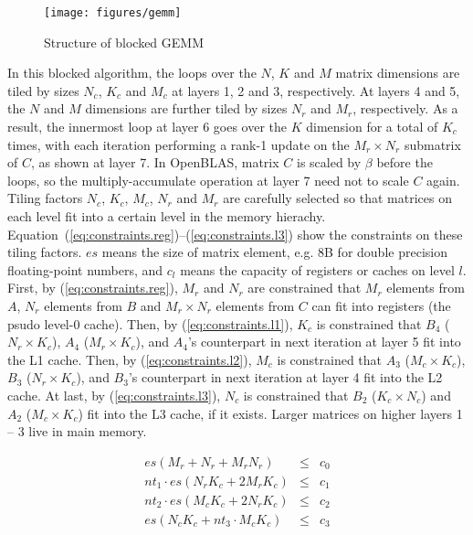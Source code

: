 \begin{figure}[t]
  \centering
  \texttt{[image: figures/gemm]}
  \caption{Structure of blocked GEMM}
  \label{fig:gemm}
\end{figure}

In this blocked algorithm, the loops over the $N$, $K$ and $M$
matrix dimensions are tiled by sizes $N_c$, $K_c$ and $M_c$ at 
layers 1, 2 and 3, respectively.
At layers 4 and 5, the $N$ and $M$ dimensions are further tiled by sizes
$N_r$ and $M_r$, respectively.
As a result, the innermost loop at layer 6 goes over the $K$
dimension for a total of $K_c$ times,
with each iteration performing a rank-1 update on
the $M_r \times N_r$ submatrix of $C$, as shown at layer 7.
In OpenBLAS, matrix $C$ is scaled by $\beta$ before the loops,
so the multiply-accumulate operation at layer 7 need not to scale $C$ again.
Tiling factors $N_c$, $K_c$, $M_c$, $N_r$ and $M_r$ are carefully selected so that
matrices on each level fit into a certain level in the memory hierachy.
Equation~(\ref{eq:constraints.reg})--(\ref{eq:constraints.l3}) show
the constraints on these tiling factors.
$es$ means the size of matrix element, e.g. 8B for double precision floating-point numbers,
and $c_l$ means the capacity of registers or caches on level $l$.
First, by (\ref{eq:constraints.reg}), $M_r$ and $N_r$ are constrained that $M_r$ elements from $A$,
$N_r$ elements from $B$ and $M_r \times N_r$ elements from $C$ can fit into registers
(the psudo level-0 cache).
Then, by (\ref{eq:constraints.l1}), $K_c$ is constrained that $B_4$ ($N_r \times K_c$),
$A_4$ ($M_r \times K_c$), and $A_4$'s counterpart in next iteration
at layer 5 fit into the L1 cache.
Then, by (\ref{eq:constraints.l2}), $M_c$ is constrained that $A_3$ ($M_c \times K_c$),
$B_3$ ($N_r \times K_c$), and $B_3$'s counterpart in next iteration
at layer 4 fit into the L2 cache.
At last, by (\ref{eq:constraints.l3}), $N_c$ is constrained that 
$B_2$ ($K_c \times N_c$) and $A_2$ ($M_c \times K_c$) fit into the L3 cache, if it exists.
Larger matrices on higher layers 1 -- 3 live in main memory.

\begin{eqnarray}
  es (M_r + N_r + M_r N_r) & \le & c_{0} \label{eq:constraints.reg}\\
  nt_{1} \cdot es (N_r K_c + 2 M_r K_c) & \le & c_{1} \label{eq:constraints.l1}\\
  nt_{2} \cdot es (M_c K_c + 2 N_r K_c) & \le & c_{2} \label{eq:constraints.l2}\\
  es (N_c K_c + nt_{3} \cdot M_c K_c)   & \le & c_{3} \label{eq:constraints.l3}
\end{eqnarray}

